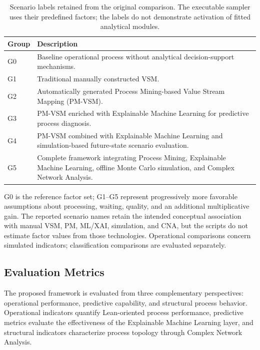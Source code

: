 \documentclass[pdflatex,iicol,Numbered,sn-basic]{sn-jnl}
\begin{document}
\begin{table}[t]
\caption{
Scenario labels retained from the original comparison. The executable sampler uses their predefined factors; the labels do not demonstrate activation of fitted analytical modules.
}
\label{tab:ablation_groups}
\centering
\begin{tabularx}{\linewidth}{p{1.2cm}X}
\toprule
\textbf{Group} & \textbf{Description} \\
\midrule

G0 &
Baseline operational process without analytical decision-support mechanisms.
\\

G1 &
Traditional manually constructed VSM.
\\

G2 &
Automatically generated Process Mining-based Value Stream Mapping (PM-VSM).
\\

G3 &
PM-VSM enriched with Explainable Machine Learning for predictive process diagnosis.
\\

G4 &
PM-VSM combined with Explainable Machine Learning and simulation-based future-state scenario evaluation.
\\

G5 &
Complete framework integrating Process Mining, Explainable Machine Learning, offline Monte Carlo simulation, and Complex Network Analysis.
\\

\bottomrule
\end{tabularx}
\end{table}

G0 is the reference factor set; G1--G5 represent progressively more favorable assumptions about processing, waiting, quality, and an additional multiplicative gain. The reported scenario names retain the intended conceptual association with manual VSM, PM, ML/XAI, simulation, and CNA, but the scripts do not estimate factor values from those technologies. Operational comparisons concern simulated indicators; classification comparisons are evaluated separately.

\subsection{Evaluation Metrics}
\label{subsec:metrics}

The proposed framework is evaluated from three complementary perspectives: operational performance, predictive capability, and structural process behavior. Operational indicators quantify Lean-oriented process performance, predictive metrics evaluate the effectiveness of the Explainable Machine Learning layer, and structural indicators characterize process topology through Complex Network Analysis.
\end{document}
